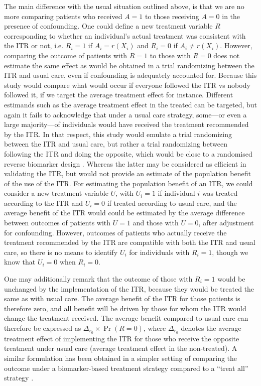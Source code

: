 \documentclass[10pt]{article}
\begin{document}
The main difference with the usual situation outlined above, is that we are no more comparing patients who received $A = 1$ to those receiving $A = 0$ in the presence of confounding. One could define a new treatment variable $R$ corresponding to whether an individual’s actual treatment was consistent with the ITR or not, i.e. $R_i = 1$ if $A_i = r(X_i)$ and $R_i = 0$ if $A_i \neq r(X_i)$. However, comparing the outcome of patients with $R = 1$ to those with $R = 0$ does not estimate the same effect as would be obtained in a trial randomizing between the ITR and usual care, even if confounding is adequately accounted for. Because this study would compare what would occur if everyone followed the ITR vs nobody followed it, if we target the average treatment effect for instance. Different estimands such as the average treatment effect in the treated can be targeted, but again it fails to acknowledge that under a usual care strategy, some---or even a large majority---of individuals would have received the treatment recommended by the ITR. In that respect, this study would emulate a trial randomizing between the ITR and usual care, but rather a trial randomizing between following the ITR and doing the opposite, which would be close to a randomised reverse biomarker design \cite{Eng2014}. Whereas the latter may be considered as efficient in validating the ITR, but would not provide an estimate of the population benefit of the use of the ITR.
For estimating the population benefit of an ITR, we could consider a new treatment variable $U$, with $U_i = 1$ if individual $i$ was treated according to the ITR and $U_i = 0$ if treated according to usual care, and the average benefit of the ITR would could be estimated by the average difference between outcomes of patients with $U = 1$ and those with $U = 0$, after adjustment for confounding. However, outcomes of patients who actually receive the treatment recommended by the ITR are compatible with both the ITR and usual care, so there is no means to identify $U_i$ for individuals with $R_i = 1$, though we know that $U_i = 0$ when $R_i = 0$. 

One may additionally remark that the outcome of those with $R_i = 1$ would be unchanged by the implementation of the ITR, because they would be treated the same as with usual care. The average benefit of the ITR for those patients is therefore zero, and all benefit will be driven by those for whom the ITR would change the treatment received. The average benefit compared to usual care can therefore be expressed as $\Delta_{r_0} \times \Pr(R = 0)$, where $\Delta_{r_0}$ denotes the average treatment effect of implementing the ITR for those who receive the opposite treatment under usual care (average treatment effect in the non-treated). A similar formulation has been obtained in a simpler setting of comparing the outcome under a biomarker-based treatment strategy compared to a “treat all” strategy \cite{Janes2014}.
\end{document}
